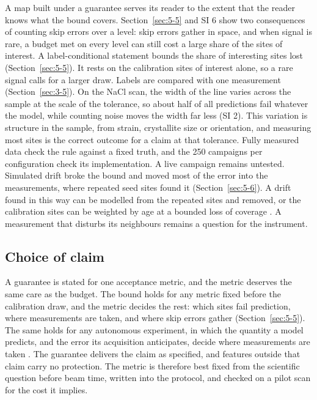 \documentclass{iopjournal}
\begin{document}
A map built under a guarantee serves its reader to the extent that the reader knows what the bound covers. Section~\ref{sec:5-5} and SI 6 show two consequences of counting skip errors over a level: skip errors gather in space, and when signal is rare, a budget met on every level can still cost a large share of the sites of interest. A label-conditional statement bounds the share of interesting sites lost (Section~\ref{sec:5-5}). It rests on the calibration sites of interest alone, so a rare signal calls for a larger draw. Labels are compared with one measurement (Section~\ref{sec:3-5}). On the NaCl scan, the width of the line varies across the sample at the scale of the tolerance, so about half of all predictions fail whatever the model, while counting noise moves the width far less (SI 2). This variation is structure in the sample, from strain, crystallite size or orientation, and measuring most sites is the correct outcome for a claim at that tolerance. Fully measured data check the rule against a fixed truth, and the 250 campaigns per configuration check its implementation. A live campaign remains untested. Simulated drift broke the bound and moved most of the error into the measurements, where repeated seed sites found it (Section~\ref{sec:5-6}). A drift found in this way can be modelled from the repeated sites and removed, or the calibration sites can be weighted by age at a bounded loss of coverage \cite{Barber2023}. A measurement that disturbs its neighbours remains a question for the instrument.

\hypertarget{choice-of-claim}{%
\subsection{Choice of claim}\label{choice-of-claim}}

A guarantee is stated for one acceptance metric, and the metric deserves the same care as the budget. The bound holds for any metric fixed before the calibration draw, and the metric decides the rest: which sites fail prediction, where measurements are taken, and where skip errors gather (Section~\ref{sec:5-5}). The same holds for any autonomous experiment, in which the quantity a model predicts, and the error its acquisition anticipates, decide where measurements are taken \cite{Noack2019,Noack2020}. The guarantee delivers the claim as specified, and features outside that claim carry no protection. The metric is therefore best fixed from the scientific question before beam time, written into the protocol, and checked on a pilot scan for the cost it implies.
\end{document}
